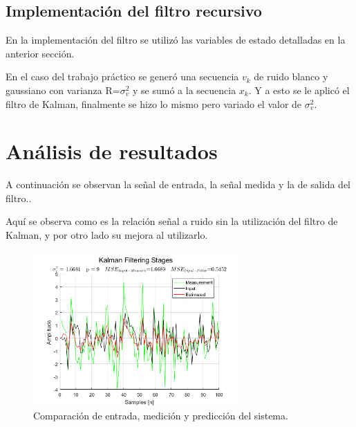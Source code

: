 \subsection{Implementación del filtro recursivo}
En la implementación del filtro se utilizó las variables de estado detalladas en la anterior sección.

En el caso del trabajo práctico se generó una secuencia  $v_k$ de ruido blanco y gaussiano con varianza R=$\sigma_v^2$ y se sumó a la secuencia $x_k$. Y a esto se le aplicó el filtro de Kalman, finalmente se hizo lo mismo pero variado el valor de $\sigma_v^2$.


\section{Análisis de resultados}
A continuación se observan la señal de entrada, la señal medida y la de salida del filtro..

Aquí se observa como es la relación señal a ruido sin la utilización del filtro de Kalman, y por otro lado su mejora al utilizarlo.

\begin{figure}[H]
\centering
	\includegraphics[width=0.7\textwidth, trim = {0 0 0 0},clip]{./Imagenes/Kalman_Filter.png}
	\caption{Comparación de entrada, medición y predicción del sistema.}
	\label{fig:kalmanfilter}
\end{figure}


